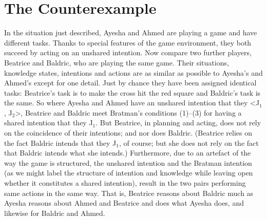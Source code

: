 \documentclass[12pt,\papersize]{extarticle}
\begin{document}
%



\section{The Counterexample}

In the situation just described,
Ayesha and Ahmed are playing a game and have different tasks.
Thanks to special features of the game environment, they both succeed by acting on an unshared intention.
Now compare two further players, Beatrice and Baldric, who are playing the same game. 
Their situations, knowledge states, intentions and actions are as similar as possible to Ayesha's and Ahmed's except for one detail.
Just by chance they have been assigned identical tasks: Beatrice's task is to make the cross hit the red square and Baldric's task is the same.
So where Ayesha and Ahmed have an unshared intention that they <J$_1$, J$_2$>,
Beatrice and Baldric meet Bratman's conditions (1)--(3) for having a shared intention that they J$_1$.  
But Beatrice, in planning and acting, does not rely on the coincidence of their intentions; and nor does Baldric.
(Beatrice relies on the fact Baldric intends that they J$_1$, of course; but she does not rely on the fact that Baldric intends what she intends.)
Furthermore, due to an artefact of the way the game is structured,
the unshared intention and the 
	Bratman intention 
	\label{df:bratman_intention}
	(as we might label the structure of intention and knowledge while leaving open whether it constitutes a shared intention), result in the two pairs performing same actions in the same way.
That is, Beatrice reasons about Baldric much as Ayesha reasons about Ahmed and Beatrice and does what Ayesha does, and likewise for Baldric and Ahmed. 
\end{document}
